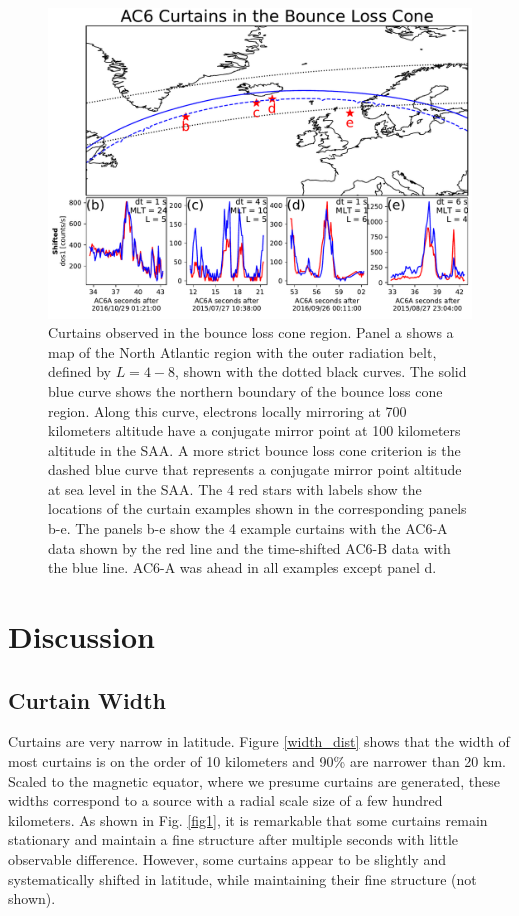 \documentclass[draft]{agujournal2019}
\begin{document}
\begin{figure}
\includegraphics[width=\textwidth]{fig3.pdf}
\caption{Curtains observed in the bounce loss cone region. Panel a shows a map of the North Atlantic region with the outer radiation belt, defined by $L=4-8$, shown with the dotted black curves. The solid blue curve shows the northern boundary of the bounce loss cone region. Along this curve, electrons locally mirroring at 700 kilometers altitude have a conjugate mirror point at 100 kilometers altitude in the SAA. A more strict bounce loss cone criterion is the dashed blue curve that represents a conjugate mirror point altitude at sea level in the SAA. The 4 red stars with labels show the locations of the curtain examples shown in the corresponding panels b-e. The panels b-e show the 4 example curtains with the AC6-A data shown by the red line and the time-shifted AC6-B data with the blue line. AC6-A was ahead in all examples except panel d.}
\label{fig3}
\end{figure}

\section{Discussion} \label{discussion}
\subsection{Curtain Width}
Curtains are very narrow in latitude. Figure \ref{width_dist} shows that the width of most curtains is on the order of 10 kilometers and 90\% are narrower than 20 km. Scaled to the magnetic equator, where we presume curtains are generated, these widths correspond to a source with a radial scale size of a few hundred kilometers. As shown in Fig. \ref{fig1}, it is remarkable that some curtains remain stationary and maintain a fine structure after multiple seconds with little observable difference. However, some curtains appear to be slightly and systematically shifted in latitude, while maintaining their fine structure (not shown).
\end{document}
